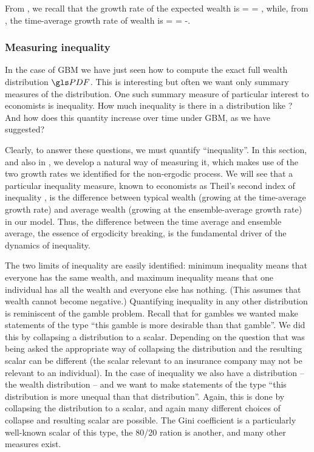 From , we recall that the growth rate of the expected wealth is
\be
\gex =  = \mu,
\ee
while, from , the time-average growth rate of wealth is
\be
\gt =  = \mu-.
\ee


\subsubsection{Measuring inequality}
In the case of GBM we have just seen how to 
compute the exact full wealth distribution $\PDF$. This is interesting but often we want only summary measures of the distribution. One such summary measure of particular interest to economists is inequality. How much inequality is there in a distribution like ? And how does this quantity increase over time under GBM, as we have suggested?

Clearly, to answer these questions, we must quantify ``inequality''. In this section, and also in \cite{AdamouPeters2016}, we develop a natural way of measuring it, which makes use of the two growth rates we identified for the non-ergodic process. We will see that a particular inequality measure, known to economists as Theil's second index of inequality \cite{Theil1967}, is the difference between typical wealth (growing at the time-average growth rate) and average wealth (growing at the ensemble-average growth rate) in our model. Thus, the difference between the time average and ensemble average, the essence of ergodicity breaking, is the fundamental driver of the dynamics of inequality.

The two limits of inequality are easily identified: minimum inequality means that everyone 
has the same wealth, and maximum inequality means that one individual has all the 
wealth and everyone else has nothing. (This assumes that wealth cannot become 
negative.) Quantifying inequality in any other distribution is reminiscent of the gamble 
problem. Recall that for gambles we wanted make statements of the type ``this gamble 
is more desirable than that gamble''. We did this by collapsing a distribution to a 
scalar. Depending on the question that was being asked 
the appropriate way of collapsing the distribution and the resulting scalar can be different 
(the scalar relevant to an insurance company may not be relevant to an individual). 
In the case of inequality we also have a distribution -- the wealth distribution -- and we 
want to make statements of the type ``this distribution is more unequal than that 
distribution''. Again, this is done by collapsing the distribution to a scalar, and again 
many different choices of collapse and resulting scalar are possible. The Gini 
coefficient is a particularly well-known scalar of this type, the 80/20 ration is another, 
and many other measures exist.

